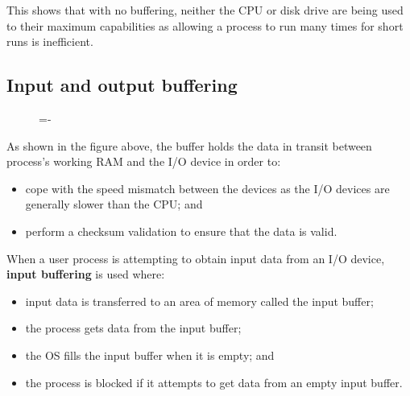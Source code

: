 \documentclass[a4paper]{systems-software}
\begin{document}
This shows that with no buffering, neither the CPU or disk drive are being used to their maximum capabilities as allowing a process to run many times for short runs is inefficient.


\subsection*{Input and output buffering}

\begin{figure}[H]
  \lineskip=-\fboxrule
\end{figure}

As shown in the figure above, the buffer holds the data in transit between process's working RAM and the I/O device in order to:
\begin{itemize}
	\item cope with the speed mismatch between the devices as the I/O devices are generally slower than the CPU; and
	\item perform a checksum validation to ensure that the data is valid.
\end{itemize}

When a user process is attempting to obtain input data from an I/O device, \textbf{input buffering} is used where:
\begin{itemize}
	\item input data is transferred to an area of memory called the input buffer;
	\item the process gets data from the input buffer;
	\item the OS fills the input buffer when it is empty; and
	\item the process is blocked if it attempts to get data from an empty input buffer.
\end{itemize}
\end{document}
